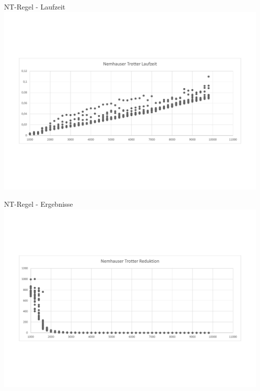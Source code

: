 \documentclass{beamer}
\begin{document}
\begin{frame}{NT-Regel - Laufzeit}
\includegraphics[scale= .4]{analysis1000_TrottNormal_runtime.pdf} 
\end{frame}
\begin{frame}{NT-Regel - Ergebnisse}
\includegraphics[scale= .4]{analysisTrott.pdf} 
\end{frame}
\end{document}
